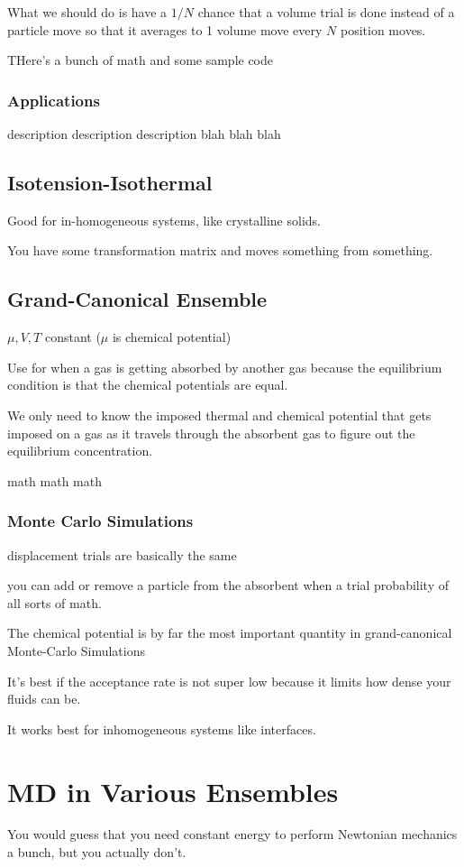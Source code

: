 \documentclass[fleqn]{report}
\begin{document}
What we should do is have a $1/N$ chance that a volume trial is done instead 
of a particle move so that it averages to 1 volume move every $N$ position moves. 

THere's a bunch of math and some sample code 

\subsection{Applications}
description description description blah blah blah

\section{Isotension-Isothermal}
Good for in-homogeneous systems, like crystalline solids. 

You have some transformation matrix and moves something from 
something. 

\section{Grand-Canonical Ensemble}
$\mu, V, T$ constant ($\mu$ is chemical potential)

Use for when a gas is getting absorbed by another gas because the 
equilibrium condition is that the chemical potentials are equal. 

We only need to know the imposed thermal and chemical potential that 
gets imposed on a gas as it travels through the absorbent gas to figure 
out the equilibrium concentration. 

math math math 

\subsection{Monte Carlo Simulations}
displacement trials are basically the same 

you can add or remove a particle from the absorbent when a trial probability 
of all sorts of math.

The chemical potential is by far the most important quantity 
in grand-canonical Monte-Carlo Simulations 

It's best if the acceptance rate is not super low because it limits how 
dense your fluids can be.

It works best for inhomogeneous systems like interfaces. 

\chapter{MD in Various Ensembles}
You would guess that you need constant energy to perform 
Newtonian mechanics a bunch, but you actually don't. 
\end{document}
